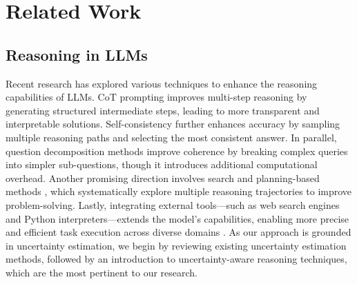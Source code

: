 \section{Related Work}
\subsection{Reasoning in LLMs}

Recent research has explored various techniques to enhance the reasoning capabilities of LLMs. CoT prompting \cite{brown2020language, kojima2022large} improves multi-step reasoning by generating structured intermediate steps, leading to more transparent and interpretable solutions. Self-consistency \cite{wang2022self} further enhances accuracy by sampling multiple reasoning paths and selecting the most consistent answer. In parallel, question decomposition methods \cite{zhou2022least, dua-etal-2022-successive, khot2022decomposed, ling2023deductive, weng-etal-2023-large} improve coherence by breaking complex queries into simpler sub-questions, though it introduces additional computational overhead. Another promising direction involves search and planning-based methods \cite{wang2023hypothesis, wang2024planning, yao2023tree, besta2024got, xue2025decompose, yang2024buffer}, which systematically explore multiple reasoning trajectories to improve problem-solving. Lastly, integrating external tools—such as web search engines and Python interpreters—extends the model’s capabilities, enabling more precise and efficient task execution across diverse domains \cite{lu2023chameleon, yao2023react, kim2024husky, chen2022program}.
As our approach is grounded in uncertainty estimation, we begin by reviewing existing uncertainty estimation methods, followed by an introduction to uncertainty-aware reasoning techniques, which are the most pertinent to our research.

